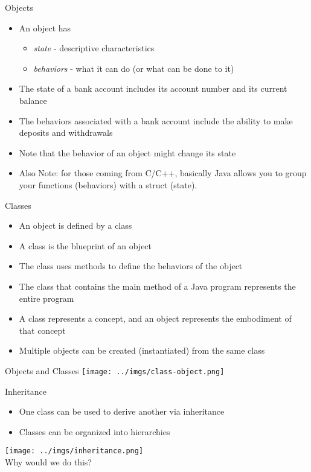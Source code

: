 \documentclass{beamer}
\begin{document}
\begin{frame}{Objects}
\begin{itemize}
\item An object has
\begin{itemize}
\item \textit{state}  -  descriptive characteristics 
\item \textit{behaviors}  -  what it can do (or what can be done to it)
\end{itemize}
\item The state of a bank account includes its account number and its current balance
\item The behaviors associated with a bank account include the ability to make deposits and withdrawals
\item Note that the behavior of an object might change its state
\item Also Note: for those coming from C/C++, basically Java allows you to group your functions (behaviors) with a struct (state).
\end{itemize}
\end{frame}

\begin{frame}{Classes}
\begin{itemize}
\item An object is defined by a class
\item A class is the blueprint of an object
\item The class uses methods to define the behaviors of the object
\item The class that contains the main method of a Java program represents the entire program
\item A class represents a concept, and an object represents the embodiment of that concept
\item Multiple objects can be created (instantiated) from the same class
\end{itemize}
\end{frame}

\begin{frame}{Objects and Classes}
\texttt{[image: ../imgs/class-object.png]}
\end{frame}

\begin{frame}{Inheritance}
\begin{itemize}
\item One class can be used to derive another via inheritance
\item Classes can be organized into hierarchies
\end{itemize}
\texttt{[image: ../imgs/inheritance.png]} \\
Why would we do this?
\end{frame}
\end{document}
